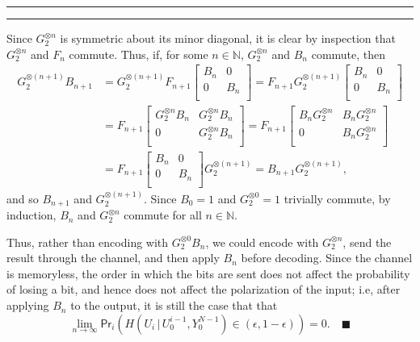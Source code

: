 \documentclass[11pt]{article}
\newcounter{questionCounter}
\newcounter{partCounter}[questionCounter]
\newenvironment{question}[2][\arabic{questionCounter}]{%
    \setcounter{partCounter}{0}%
    \vspace{.25in} \hrule \vspace{0.5em}%
        \noindent{\bf #2}%
    \vspace{0.8em} \hrule \vspace{.10in}%
    \addtocounter{questionCounter}{1}%
}{}
\newcommand{\mqed}{\quad \blacksquare}
\newcommand{\N}{\mathbb{N}} %
\newcommand{\pr}[1]{\mathsf{Pr}\left( #1 \right)} %
\newcommand{\prv}[2]{\mathsf{Pr}_{#2}\left( #1 \right)}
\newcommand{\giv}{\, | \,} %
\begin{document}
\begin{question}{Problem 1}
Since $G_2^{\otimes n}$ is symmetric about its minor diagonal, it is clear by
inspection that $G_2^{\otimes n}$ and $F_n$ commute. Thus, if, for some
$n \in \N$, $G_2^{\otimes n}$ and $B_n$ commute, then
\begin{align*}
G_2^{\otimes (n + 1)} B_{n + 1}
  & = G_2^{\otimes (n + 1)}F_{n + 1}
        \begin{bmatrix}
            B_n & 0 \\
            0 & B_n \\
        \end{bmatrix}
    = F_{n + 1} G_2^{\otimes (n + 1)}
        \begin{bmatrix}
            B_n & 0 \\
            0 & B_n \\
        \end{bmatrix} \\
  & = F_{n + 1}
        \begin{bmatrix}
            G_2^{\otimes n} B_n & G_2^{\otimes n} B_n \\
            0 & G_2^{\otimes n} B_n \\
        \end{bmatrix}
    = F_{n + 1}
        \begin{bmatrix}
            B_n G_2^{\otimes n} & B_n G_2^{\otimes n} \\
            0 & B_n G_2^{\otimes n} \\
        \end{bmatrix} \\
  & = F_{n + 1}
        \begin{bmatrix}
            B_n & 0 \\
            0 & B_n \\
        \end{bmatrix} G_2^{\otimes (n + 1)}
    = B_{n + 1} G_2^{\otimes (n + 1)},
\end{align*}
and so $B_{n + 1}$ and $G_2^{\otimes (n + 1)}$. Since $B_0 = 1$ and
$G_2^{\otimes 0} = 1$ trivially commute, by induction, $B_n$ and
$G_2^{\otimes n}$ commute for all $n \in \N$.

Thus, rather than encoding with
$G_2^{\otimes 0} B_n$, we could encode with $G_2^{\otimes n}$, send the result
through the channel, and then apply $B_n$ before decoding. Since the channel is
memoryless, the order in which the bits are sent does not affect the
probability of losing a bit, and hence does not affect the polarization of the
input; i.e, after applying $B_n$ to the output, it is still the case that
that
\[\lim_{n \rightarrow \infty}
    \prv{H(U_i \giv U_0^{i - 1}, Y_0^{N - 1}) \in (\epsilon, 1 - \epsilon)}{i}
    = 0. \mqed
\]
\end{question}
\end{document}
